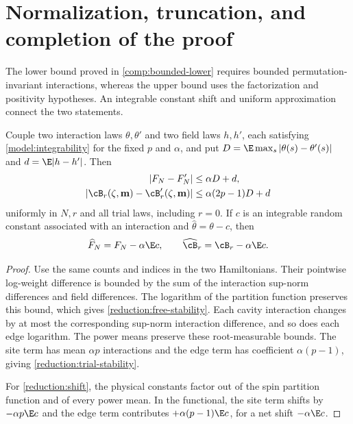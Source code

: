 \section{Normalization, truncation, and completion of the proof}
\label{reduction:section}

The lower bound proved in \cref{comp:bounded-lower} requires bounded
permutation-invariant interactions, whereas the upper bound uses the
factorization and positivity hypotheses. An integrable constant shift
and uniform approximation connect the two statements.

\begin{lemma}[Stability]\label{reduction:stability}
Couple two interaction laws $\theta,\theta'$ and two field laws $h,h'$,
each satisfying \eqref{model:integrability} for the fixed $p$ and $\alpha$,
and put $D=\E\max_s|\theta(s)-\theta'(s)|$ and
$d=\E|h-h'|$. Then
\begin{align}
 |F_N-F_N'|&\le\alpha D+d,\label{reduction:free-stability}\\
 |\cB_r(\zeta,\mathbf m)-\cB_r'(\zeta,\mathbf m)|
 &\le\alpha(2p-1)D+d\label{reduction:trial-stability}
\end{align}
uniformly in $N,r$ and all trial laws, including $r=0$.
If $c$ is an integrable random constant associated with an interaction and
$\widehat\theta=\theta-c$, then
\begin{equation}\label{reduction:shift}
 \widehat F_N=F_N-\alpha\E c,
 \qquad\widehat{\cB}_r=\cB_r-\alpha\E c.
\end{equation}
\end{lemma}

\begin{proof}
Use the same counts and indices in the two Hamiltonians. Their pointwise
log-weight difference is bounded by the sum of the interaction sup-norm
differences and field differences. The logarithm of the partition function
preserves this bound, which gives \eqref{reduction:free-stability}.
Each cavity interaction changes by at most the corresponding sup-norm
interaction difference, and so does each edge logarithm. The power means
preserve these root-measurable bounds. The site term has mean $\alpha p$
interactions and the edge term has coefficient $\alpha(p-1)$, giving
\eqref{reduction:trial-stability}.

For \eqref{reduction:shift}, the physical constants factor out of the spin
partition function and of every power mean. In the functional, the site
term shifts by $-\alpha p\E c$ and the edge term contributes
$+\alpha(p-1)\E c$, for a net shift $-\alpha\E c$.
\end{proof}

